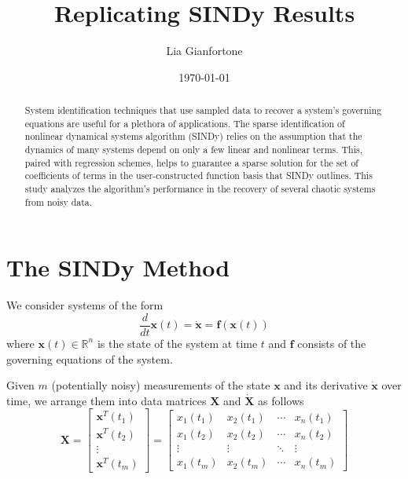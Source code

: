 \documentclass[%
 aip,12pt,
rsi,%
 amsmath,amssymb,
 reprint,%
]{revtex4-1}
\begin{document}

\title[Replicating SINDy Results]{Replicating SINDy Results}
\large{

\author{Lia Gianfortone}


\date{\today}%

\begin{abstract}
System identification techniques that use sampled data to recover a system's governing equations are useful for a plethora of applications. The sparse identification of nonlinear dynamical systems algorithm (SINDy) relies on the assumption that the dynamics of many systems depend on only a few linear and nonlinear terms. This, paired with regression schemes, helps to guarantee a sparse solution for the set of coefficients of terms in the user-constructed function basis that SINDy outlines. This study analyzes the algorithm's performance in the recovery of several chaotic systems from noisy data.


\end{abstract}

\maketitle



\section{The SINDy Method\protect}
We consider systems of the form 
\begin{equation}
\frac{d}{dt}\bm{x}(t) = \bm{\dot{x}} = \bm{f}(\bm{x}(t))
\end{equation}
where $\bm{x}(t) \in \mathbb{R}^n$ is the state of the system at time $t$ and $\bm{f}$ consists of the governing equations of the system. 

Given $m$ (potentially noisy) measurements of the state $\bm{x}$ and its derivative $\bm{\dot{x}}$ over time, we arrange them into data matrices $\bm{X}$ and $\bm{\dot{X}}$ as follows
\begin{equation*}
  \bm{X} = \begin{bmatrix} 
        \bm{x}^T(t_1) \\ \bm{x}^T(t_2) \\ \vdots \\ \bm{x}^T(t_m)
      \end{bmatrix}
       = \begin{bmatrix}
          x_1(t_1) & x_2(t_1) & \cdots & x_n(t_1) \\
          x_1(t_2) & x_2(t_2) & \cdots & x_n(t_2) \\
          \vdots   & \vdots   & \ddots & \vdots   \\
          x_1(t_m) & x_2(t_m) & \cdots & x_n(t_m) 
        \end{bmatrix}
\end{equation*}

}
\end{document}
